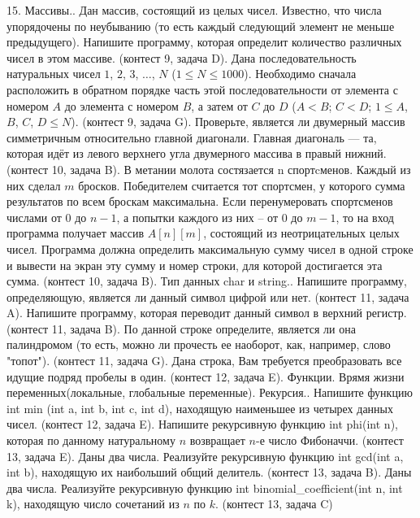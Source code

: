 \documentclass[a4paper,12pt]{article}
\begin{document}
15. Массивы.. Дан массив, состоящий из целых чисел. Известно, что числа упорядочены по неубыванию (то есть каждый следующий элемент не меньше предыдущего). Напишите программу, которая определит количество различных чисел в этом массиве. (контест 9, задача D). Дана последовательность натуральных чисел $1$, $2$, $3$, $\dots$, $N$ ($1 \le N \le 1000$). Необходимо сначала расположить в обратном порядке часть этой последовательности от элемента с номером $A$ до элемента с номером $B$, а затем от $C$ до $D$ ($A < B$; $C < D$; $1 \le A$, $B$, $C$, $D \le N$). (контест 9, задача G). Проверьте, является ли двумерный массив симметричным относительно главной диагонали. Главная диагональ — та, которая идёт из левого верхнего угла двумерного массива в правый нижний. (контест 10, задача B). В метании молота состязается n спортcменов. Каждый из них сделал $m$ бросков. Победителем считается тот спортсмен, у которого сумма результатов по всем броскам максимальна. Если перенумеровать спортсменов числами от $0$ до $n-1$, а попытки каждого из них – от $0$ до $m-1$, то на вход программа получает массив $A[n][m]$, состоящий из неотрицательных целых чисел. Программа должна определить максимальную сумму чисел в одной строке и вывести на экран эту сумму и номер строки, для которой достигается эта сумма. (контест 10, задача B). Тип данных char и string.. Напишите программу, определяющую, является ли данный символ цифрой или нет. (контест 11, задача A). Напишите программу, которая переводит данный символ в верхний регистр. (контест 11, задача B). По данной строке определите, является ли она палиндромом (то есть, можно ли прочесть ее наоборот, как, например, слово "топот"). (контест 11, задача G). Дана строка, Вам требуется преобразовать все идущие подряд пробелы в один. (контест 12, задача E). Функции. Врямя жизни переменных(локальные, глобальные переменные). Рекурсия.. Напишите функцию int min (int a, int b, int c, int d), находящую наименьшее из четырех данных чисел. (контест 12, задача E). Напишите рекурсивную функцию int phi(int n), которая по данному натуральному $n$ возвращает $n$-е число Фибоначчи. (контест 13, задача E). Даны два числа. Реализуйте рекурсивную функцию int gcd(int a, int b), находящую их наибольший общий делитель. (контест 13, задача B). Даны два числа. Реализуйте рекурсивную функцию int binomial\_coefficient(int n, int k), находящую число сочетаний из $n$ по $k$. (контест 13, задача C)
\end{document}
